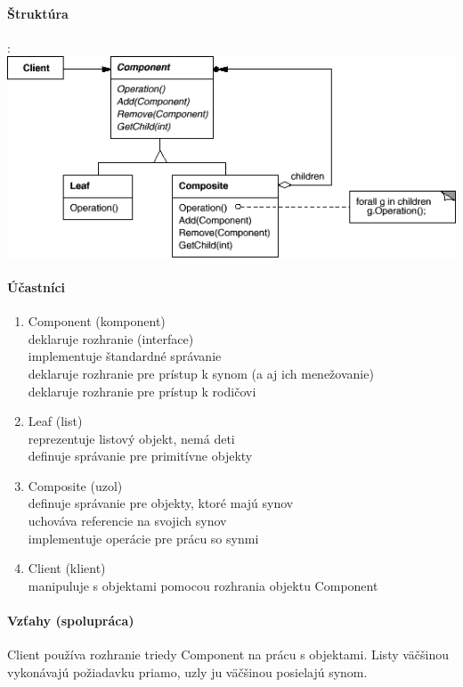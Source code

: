 		\paragraph{Štruktúra}

		:\\
			\includegraphics[width=.9\textwidth]{images/programovanie/composite2}

		\paragraph{Účastníci}
			\begin{enumerate}
				\item Component (komponent)\\
				deklaruje rozhranie (interface)\\
				implementuje štandardné správanie\\
				deklaruje rozhranie pre prístup k synom (a aj ich menežovanie)\\
				deklaruje rozhranie pre prístup k rodičovi
				\item Leaf (list)\\
				reprezentuje listový objekt, nemá deti\\
				definuje správanie pre primitívne objekty
				\item Composite (uzol)\\
				definuje správanie pre objekty, ktoré majú synov\\
				uchováva referencie na svojich synov\\
				implementuje operácie pre prácu so synmi
				\item Client (klient)\\
				manipuluje s objektami pomocou rozhrania objektu Component
			\end{enumerate}
		\paragraph{Vzťahy (spolupráca)}
		Client používa rozhranie triedy Component na prácu s objektami. Listy väčšinou vykonávajú požiadavku priamo, uzly ju väčšinou posielajú synom.

